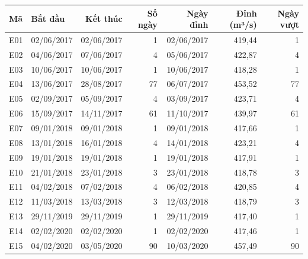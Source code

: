 \begin{tabular}{llrrrrr}
\toprule
Mã & Bắt đầu & Kết thúc & Số ngày & Ngày đỉnh & Đỉnh (m³/s) & Ngày vượt \\
\midrule
E01 & 02/06/2017 & 02/06/2017 & 1 & 02/06/2017 & 419{,}44 & 1 \\
E02 & 04/06/2017 & 07/06/2017 & 4 & 05/06/2017 & 422{,}87 & 4 \\
E03 & 10/06/2017 & 10/06/2017 & 1 & 10/06/2017 & 418{,}28 & 1 \\
E04 & 13/06/2017 & 28/08/2017 & 77 & 06/07/2017 & 453{,}52 & 77 \\
E05 & 02/09/2017 & 05/09/2017 & 4 & 03/09/2017 & 423{,}71 & 4 \\
E06 & 15/09/2017 & 14/11/2017 & 61 & 11/10/2017 & 439{,}97 & 61 \\
E07 & 09/01/2018 & 09/01/2018 & 1 & 09/01/2018 & 417{,}66 & 1 \\
E08 & 13/01/2018 & 16/01/2018 & 4 & 14/01/2018 & 423{,}21 & 4 \\
E09 & 19/01/2018 & 19/01/2018 & 1 & 19/01/2018 & 417{,}91 & 1 \\
E10 & 21/01/2018 & 23/01/2018 & 3 & 23/01/2018 & 418{,}78 & 3 \\
E11 & 04/02/2018 & 07/02/2018 & 4 & 06/02/2018 & 420{,}85 & 4 \\
E12 & 11/03/2018 & 13/03/2018 & 3 & 12/03/2018 & 418{,}79 & 3 \\
E13 & 29/11/2019 & 29/11/2019 & 1 & 29/11/2019 & 417{,}40 & 1 \\
E14 & 02/02/2020 & 02/02/2020 & 1 & 02/02/2020 & 417{,}46 & 1 \\
E15 & 04/02/2020 & 03/05/2020 & 90 & 10/03/2020 & 457{,}49 & 90 \\
\bottomrule
\end{tabular}
